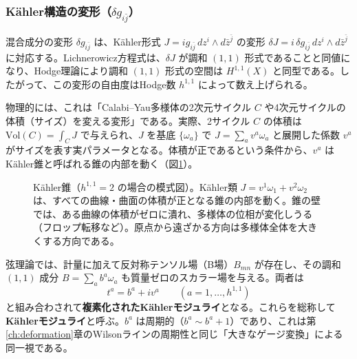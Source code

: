 \documentclass[uplatex, dvipdfmx, book]{jsbook}
\let\origsubsubsection\subsubsection
\renewcommand{\subsection}{\origsubsubsection}
\renewcommand{\subsubsection}{\paragraph}
\begin{document}
\subsection{K\"ahler構造の変形（$\delta g_{i\bar{j}}$）}

混合成分の変形 $\delta g_{i\bar{j}}$ は、K\"ahler形式 $J = i g_{i\bar{j}}\, dz^i \wedge d\bar{z}^{\bar{j}}$ の変形 $\delta J = i\,\delta g_{i\bar j}\, dz^i \wedge d\bar z^{\bar j}$ に対応する。Lichnerowicz方程式は、$\delta J$ が調和 $(1,1)$ 形式であることと同値になり、Hodge理論により調和 $(1,1)$ 形式の空間は $H^{1,1}(X)$ と同型である。したがって、この変形の自由度はHodge数 $h^{1,1}$ によって数え上げられる。

物理的には、これは「Calabi--Yau多様体の2次元サイクル $C$ や4次元サイクルの体積（サイズ）を変える変形」である。実際、2サイクル $C$ の体積は $\mathrm{Vol}(C) = \int_C J$ で与えられ、$J$ を基底 $\{\omega_a\}$ で $J = \sum_a v^a \omega_a$ と展開した係数 $v^a$ がサイズを表す実パラメータとなる。体積が正であるという条件から、$v^a$ はK\"ahler錐と呼ばれる錐の内部を動く（図\ref{fig:kahler-cone}）。

\begin{figure}[htbp]
\centering
{}
\caption{K\"ahler錐（$h^{1,1} = 2$ の場合の模式図）。K\"ahler類 $J = v^1\omega_1 + v^2\omega_2$ は、すべての曲線・曲面の体積が正となる錐の内部を動く。錐の壁では、ある曲線の体積がゼロに潰れ、多様体の位相が変化しうる（フロップ転移など）。原点から遠ざかる方向は多様体全体を大きくする方向である。}
\label{fig:kahler-cone}
\end{figure}


弦理論では、計量に加えて反対称テンソル場（B場）$B_{mn}$ が存在し、その調和 $(1,1)$ 成分 $B = \sum_a b^a\omega_a$ も質量ゼロのスカラー場を与える。両者は
\begin{equation}
    t^a = b^a + i v^a \qquad (a = 1, \dots, h^{1,1})
\end{equation}
と組み合わされて\textbf{複素化されたK\"ahlerモジュライ}となる。これらを総称して\textbf{K\"ahlerモジュライ}と呼ぶ。$b^a$ は周期的（$b^a \sim b^a + 1$）であり、これは第\ref{ch:deformation}章のWilsonラインの周期性と同じ「大きなゲージ変換」による同一視である。
\end{document}
